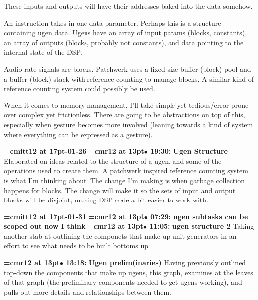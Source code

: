 These inputs and outputs will have their addresses baked into the data somehow.
\par

An instruction takes in one data parameter. Perhaps this is a structure containing ugen data. Ugens have an array of input params (blocks, constants), an array of outputs (blocks, probably not constants), and data pointing to the internal state of the DSP.
\par

Audio rate signals are blocks. Patchwerk uses a fixed size buffer (block) pool and a buffer (block) stack with reference counting to manage blocks. A similar kind of reference counting system could possibly be used.
\par

When it comes to memory management, I'll take simple yet tedious/error-prone over complex yet frictionless. There are going to be abstractions on top of this, especially when gesture becomes more involved (leaning towards a kind of system where everything can be expressed as a gesture).
\par

{\medskip\noindent\bf\font\titlefont=cmitt12 at 17pt-01-26}\medskip
{\smallskip\noindent\bf\font\titlefont=cmr12 at 13pt\titlefont $\bullet$ 19:30: Ugen Structure}\smallskip
Elaborated on ideas related to the structure of a ugen, and some of the operations used to create them. A patchwerk inspired reference counting system is what I'm thinking about. The change I'm making is when garbage collection happens for blocks. The change will make it so the sets of input and output blocks will be disjoint, making DSP code a bit easier to work with.
\par

{\medskip\noindent\bf\font\titlefont=cmitt12 at 17pt-01-31}\medskip
{\smallskip\noindent\bf\font\titlefont=cmr12 at 13pt\titlefont $\bullet$ 07:29: ugen subtasks can be scoped out now I think}\smallskip
{\smallskip\noindent\bf\font\titlefont=cmr12 at 13pt\titlefont $\bullet$ 11:05: ugen structure 2}\smallskip
Taking another stab at outlining the componets that make up unit generators in an effort to see what needs to be built bottoms up
\par

{\smallskip\noindent\bf\font\titlefont=cmr12 at 13pt\titlefont $\bullet$ 13:18: Ugen prelim(inaries)}\smallskip
Having previously outlined top-down the components that make up ugens, this graph, examines at the leaves of that graph (the preliminary components needed to get ugens working), and pulls out more details and relationships between them.
\par

